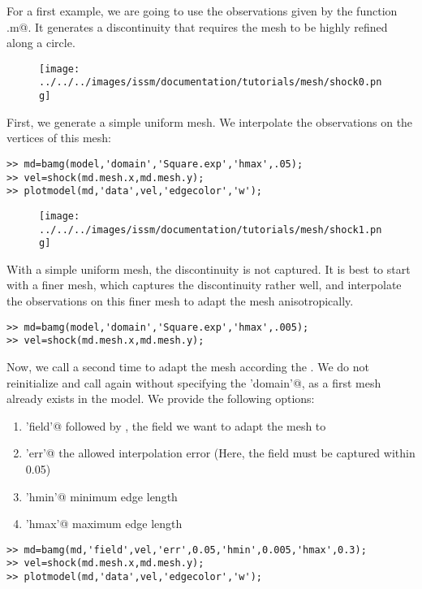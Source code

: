 For a first example, we are going to use the observations given by the function \verb@shock.m@. It generates a discontinuity that requires the mesh to be highly refined along a circle.
\begin{figure}[H]
	\begin{center}
		\texttt{[image: ../../../images/issm/documentation/tutorials/mesh/shock0.png]}
	\end{center}
\end{figure}
First, we generate a simple uniform mesh. We interpolate the observations on the vertices of this mesh:
\begin{verbatim}>> md=bamg(model,'domain','Square.exp','hmax',.05);
>> vel=shock(md.mesh.x,md.mesh.y);
>> plotmodel(md,'data',vel,'edgecolor','w');
\end{verbatim}
\begin{figure}[H]
	\begin{center}
		\texttt{[image: ../../../images/issm/documentation/tutorials/mesh/shock1.png]}
	\end{center}
\end{figure}
With a simple uniform mesh, the discontinuity is not captured. It is best to start with a finer mesh, which captures the discontinuity rather well, and interpolate the observations on this finer mesh to adapt the mesh anisotropically.
\begin{verbatim}>> md=bamg(model,'domain','Square.exp','hmax',.005);
>> vel=shock(md.mesh.x,md.mesh.y);
\end{verbatim}
Now, we call \verb@bamg@ a second time to adapt the mesh according the \verb@vel@. We do not reinitialize \verb@md@ and call \verb@bamg@ again without specifying the \verb@'domain'@, as a first mesh already exists in the model. We provide the following options:
\begin{enumerate}
	\item \verb@'field'@ followed by \verb@vel@, the field we want to adapt the mesh to
	\item \verb@'err'@ the allowed interpolation error (Here, the field must be captured within 0.05)
	\item \verb@'hmin'@ minimum edge length
	\item \verb@'hmax'@ maximum edge length
\end{enumerate}
\begin{verbatim}>> md=bamg(md,'field',vel,'err',0.05,'hmin',0.005,'hmax',0.3);
>> vel=shock(md.mesh.x,md.mesh.y);
>> plotmodel(md,'data',vel,'edgecolor','w');
\end{verbatim}
